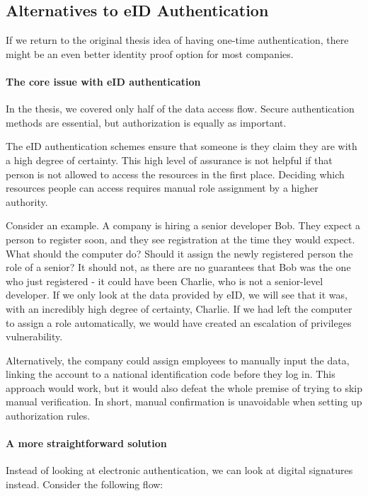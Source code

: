 \subsection{Alternatives to eID Authentication}

If we return to the original thesis idea of having one-time authentication, there might be an even better identity proof option for most companies.

\paragraph{The core issue with eID authentication}

In the thesis, we covered only half of the data access flow. Secure authentication methods are essential, but authorization is equally as important.

The eID authentication schemes ensure that someone is they claim they are with a high degree of certainty. This high level of assurance is not helpful if that person is not allowed to access the resources in the first place. Deciding which resources people can access requires manual role assignment by a higher authority.

Consider an example. A company is hiring a senior developer Bob. They expect a person to register soon, and they see registration at the time they would expect. What should the computer do? Should it assign the newly registered person the role of a senior? It should not, as there are no guarantees that Bob was the one who just registered - it could have been Charlie, who is not a senior-level developer. If we only look at the data provided by eID, we will see that it was, with an incredibly high degree of certainty, Charlie. If we had left the computer to assign a role automatically, we would have created an escalation of privileges vulnerability.

Alternatively, the company could assign employees to manually input the data, linking the account to a national identification code before they log in. This approach would work, but it would also defeat the whole premise of trying to skip manual verification. In short, manual confirmation is unavoidable when setting up authorization rules.

\paragraph{A more straightforward solution}

Instead of looking at electronic authentication, we can look at digital signatures instead. Consider the following flow:

